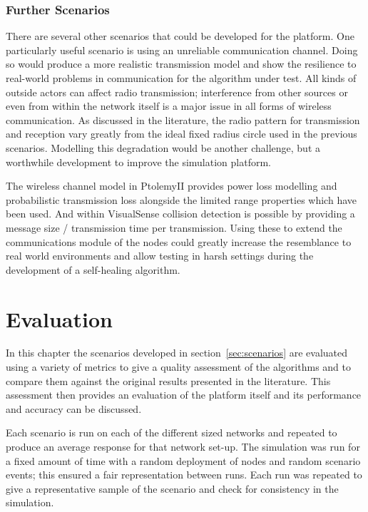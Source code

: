 \documentclass[authoryearcitations]{UoYCSproject}
\begin{document}
\subsection{Further Scenarios}
\label{subsec:otherScenarios}
There are several other scenarios that could be developed for the platform. One particularly useful scenario is using an unreliable communication channel. Doing so would produce a more realistic transmission model and show the resilience to real-world problems in communication for the algorithm under test. All kinds of outside actors can affect radio transmission; interference from other sources or even from within the network itself is a major issue in all forms of wireless communication. As discussed in the literature, the radio pattern for transmission and reception vary greatly from the ideal fixed radius circle used in the previous scenarios. Modelling this degradation would be another challenge, but a worthwhile development to improve the simulation platform.

The wireless channel model in PtolemyII provides power loss modelling and probabilistic transmission loss alongside the limited range properties which have been used. And within VisualSense collision detection is possible by providing a message size / transmission time per transmission. Using these to extend the communications module of the nodes could greatly increase the resemblance to real world environments and allow testing in harsh settings during the development of a self-healing algorithm.

\chapter{Evaluation}
\label{cha:Eval}

In this chapter the scenarios developed in section~\ref{sec:scenarios} are evaluated using a variety of metrics to give a quality assessment of the algorithms and to compare them against the original results presented in the literature. This assessment then provides an evaluation of the platform itself and its performance and accuracy can be discussed.

Each scenario is run on each of the different sized networks and repeated to produce an average response for that network set-up. The simulation was run for a fixed amount of time with a random deployment of nodes and random scenario events; this ensured a fair representation between runs. Each run was repeated to give a representative sample of the scenario and check for consistency in the simulation.
\end{document}
